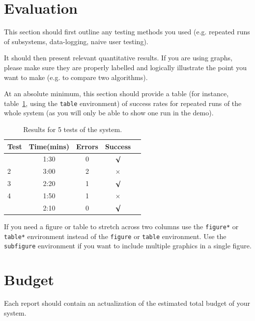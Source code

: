 \documentclass{article}
\begin{document}
\section{Evaluation}

This section should first outline any testing methods you used (e.g. repeated runs of subsystems, data-logging, naive user testing). 

It should then present relevant quantitative results. If you are using graphs, please make sure they are properly labelled and logically illustrate the point you want to make (e.g. to compare two algorithms).


At an absolute minimum, this section should provide a table (for instance, table~\ref{tab:sample-table}, using the \verb+table+ environment) of success rates for repeated runs of the whole system (as you will only be able to show one run in the demo).

\begin{table}[h]
\vskip 3mm
\begin{center}
\begin{small}
\begin{sc}
\begin{tabular}{lcccr}
\hline
\abovespace\belowspace
Test  & Time(mins) & Errors & Success \\
\hline
\abovespace
1    & 1:30 & 0 & $\surd$ \\
2    & 3:00 & 2 & $\times$\\
3    & 2:20 & 1 & $\surd$ \\
4    & 1:50 & 1 & $\times$\\
\belowspace
5    & 2:10 & 0 & $\surd$ \\
\hline
\end{tabular}
\end{sc}
\end{small}
\caption{Results for 5 tests of the system.}
\label{tab:sample-table}
\end{center}
\vskip -3mm
\end{table}

If you need a figure or table to stretch across two columns use the \verb+figure*+ or \verb+table*+ environment instead of the \verb+figure+ or \verb+table+ environment.  Use the \verb+subfigure+ environment if you want to include multiple graphics in a single figure.

\section{Budget}
Each report should contain an actualization of the estimated total budget 
of your system.
\end{document}
